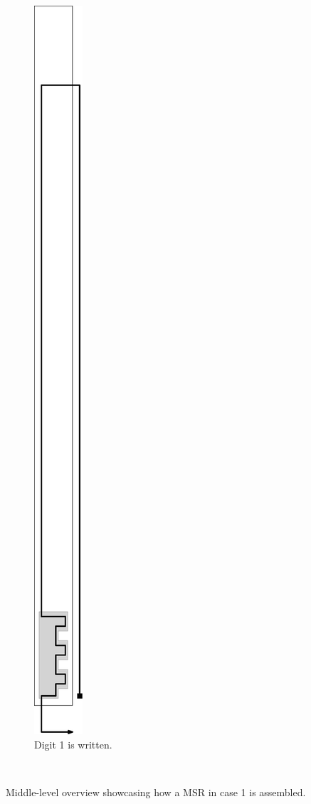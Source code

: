 \documentclass[10pt]{article}
\begin{document}
\begin{figure}
\begin{subfigure}[t]{0.14\textwidth}
        \includegraphics[width=.45in,valign=t]{mid_level_1digit_msr_phase_2}
        \caption{\label{fig:mid_level_1digit_msr_phase_2} Digit 1 is written. }
    \end{subfigure}%
   ~
    \caption{\label{fig:mid_level_1digit_msr_overview} Middle-level overview showcasing how a MSR in case 1 is assembled.  }
\end{figure}
\end{document}
